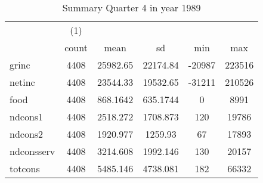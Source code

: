 \begin{table}[htbp]\centering
\def\sym#1{\ifmmode^{#1}\else\(^{#1}\)\fi}
\caption{Summary Quarter 4 in year 1989 \label{sum\_Q4\_y1989}}
\begin{tabular}{l*{1}{ccccc}}
\hline\hline
            &\multicolumn{1}{c}{(1)}&            &            &            &            \\
            &       count&        mean&          sd&         min&         max\\
\hline
grinc       &        4408&    25982.65&    22174.84&      -20987&      223516\\
netinc      &        4408&    23544.33&    19532.65&      -31211&      210526\\
food        &        4408&    868.1642&    635.1744&           0&        8991\\
ndcons1     &        4408&    2518.272&    1708.873&         120&       19786\\
ndcons2     &        4408&    1920.977&     1259.93&          67&       17893\\
ndconsserv  &        4408&    3214.608&    1992.146&         130&       20157\\
totcons     &        4408&    5485.146&    4738.081&         182&       66332\\
\hline\hline
\end{tabular}
\end{table}
